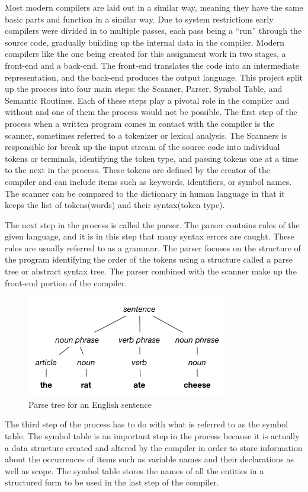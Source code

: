 \documentclass[12pt, oneside]{article}   	%
\begin{document}
Most modern compilers are laid out in a similar way, meaning they have
the same basic parts and function in a similar way. Due to system restrictions
early compilers were divided in to multiple passes, each pass being a “run”
through the source code, gradually building up the internal data in the compiler.
Modern compilers like the one being created for this assignment work in two
stages, a front-end and a back-end. The front-end translates the code into an
intermediate representation, and the back-end produces the output language.
This project split up the process into four main steps: the Scanner, Parser,
Symbol Table, and Semantic Routines. Each of these steps play a pivotal role in
the compiler and without and one of them the process would not be possible. The
first step of the process when a written program comes in contact with the
compiler is the scanner, sometimes referred to a tokenizer or lexical analysis.
The Scanners is responsible for break up the input stream of the source code
into individual tokens or terminals, identifying the token type, and passing tokens
one at a time to the next in the process. These tokens are defined by the creator
of the compiler and can include items such as keywords, identifiers, or symbol
names. The scanner can be compared to the dictionary in human language in that it keeps the list of tokens(words) and their syntax(token type).

The next step in the process is called the parser. The parser contains
rules of the given language, and it is in this step that many syntax
errors are caught. These rules are usually referred to as a grammar. The parser focuses on the structure of the program identifying
the order of the tokens using a structure called a parse tree or abstract syntax
tree. The parser combined with the scanner make up the front-end portion of the
compiler.

\begin{figure}[h!]
	\centerline{\includegraphics[width=.4\linewidth]{pics/p_tree}}
	\caption{Parse tree for an English sentence}
\end{figure}

 The third step of the process has to do with what is referred to as the
symbol table. The symbol table is an important step in the process because it is
actually a data structure created and altered by the compiler in order to store
information about the occurrences of items such as variable names and their
declarations as well as scope. The symbol table stores the names of all the
entities in a structured form to be used in the last step of the compiler.
\end{document}
